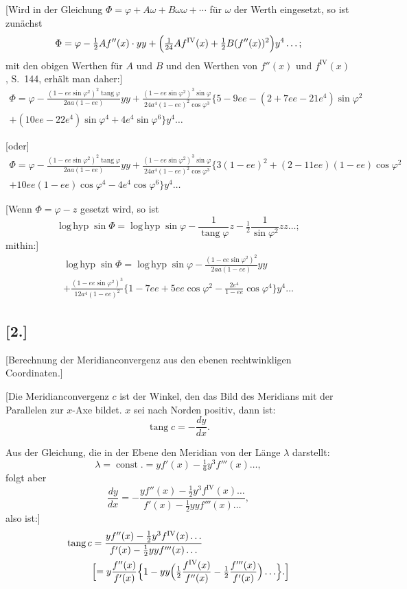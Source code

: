 \documentclass[12pt,a4paper]{article}
\newcommand{\tang}{\operatorname{tang}}
\newcommand{\loghyp}{\operatorname{log\,hyp}}
\DeclareMathOperator{\const}{const}
\begin{document}
[Wird in der Gleichung $\Phi = \varphi + A\omega + B\omega\omega + \cdots$ für $\omega$ der Werth eingesetzt, so ist zunächst
\[
\Phi = \varphi - \tfrac{1}{2}Af''(x)\cdot yy + \Bigl(\tfrac{1}{24}Af^{\mathrm{IV}}(x) + \tfrac{1}{2}B(f''(x))^2\Bigr)y^4\ldots;
\]
mit den obigen Werthen für $A$ und $B$ und den Werthen von $f''(x)$ und $f^{\mathrm{IV}}(x)$, S.~144, erhält man daher:]
\begin{multline*}
\Phi = \varphi - \frac{(1-ee\sin\varphi^2)^2\tang\varphi}{2aa(1-ee)}yy + \frac{(1-ee\sin\varphi^2)^3\sin\varphi}{24a^4(1-ee)^2\cos\varphi^3}\{5-9ee-(2+7ee-21e^4)\sin\varphi^2\\
+(10ee-22e^4)\sin\varphi^4 + 4e^4\sin\varphi^6\}y^4\ldots
\end{multline*}

[oder]
\begin{multline*}
\Phi = \varphi - \frac{(1-ee\sin\varphi^2)^2\tang\varphi}{2aa(1-ee)}yy + \frac{(1-ee\sin\varphi^2)^3\sin\varphi}{24a^4(1-ee)^2\cos\varphi^3}\{3(1-ee)^2+(2-11ee)(1-ee)\cos\varphi^2\\
+10ee(1-ee)\cos\varphi^4 - 4e^4\cos\varphi^6\}y^4\ldots
\end{multline*}

[Wenn $\Phi = \varphi - z$ gesetzt wird, so ist
\[
\loghyp\sin\Phi = \loghyp\sin\varphi - \frac{1}{\tang\varphi}z - \tfrac{1}{2}\frac{1}{\sin\varphi^2}zz\ldots;
\]
mithin:]
\begin{multline*}
\loghyp\sin\Phi = \loghyp\sin\varphi - \frac{(1-ee\sin\varphi^2)^2}{2aa(1-ee)}yy\\
+ \frac{(1-ee\sin\varphi^2)^3}{12a^4(1-ee)^2}\{1-7ee+5ee\cos\varphi^2-\frac{2e^4}{1-ee}\cos\varphi^4\}y^4\ldots
\end{multline*}

\subsection*{[2.]}
\begin{center}
[Berechnung der Meridianconvergenz aus den ebenen rechtwinkligen\\Coordinaten.]
\end{center}

[Die Meridianconvergenz $c$ ist der Winkel, den das Bild des Meridians mit der Parallelen zur $x$-Axe bildet. $x$ sei nach Norden positiv, dann ist:
\[
\tang c = -\frac{dy}{dx}.
\]

Aus der Gleichung, die in der Ebene den Meridian von der Länge $\lambda$ darstellt:
\[
\lambda = \const. = yf'(x) - \tfrac{1}{6}y^3f'''(x)\ldots,
\]
folgt aber
\[
\frac{dy}{dx} = -\frac{yf''(x) - \tfrac{1}{2}y^3f^{\mathrm{IV}}(x)\ldots}{f'(x) - \tfrac{1}{2}yyf'''(x)\ldots},
\]
also ist:]
\begin{align*}
\tang c &= \frac{yf''(x) - \tfrac{1}{2}y^3f^{\mathrm{IV}}(x)\ldots}{f'(x) - \tfrac{1}{2}yyf'''(x)\ldots}\\
&\Bigl[= y\frac{f''(x)}{f'(x)}\Bigl\{1 - yy\Bigl(\tfrac{1}{2}\frac{f^{\mathrm{IV}}(x)}{f''(x)} - \tfrac{1}{2}\frac{f'''(x)}{f'(x)}\Bigr)\ldots\Bigr\}.\Bigr]
\end{align*}
\end{document}
